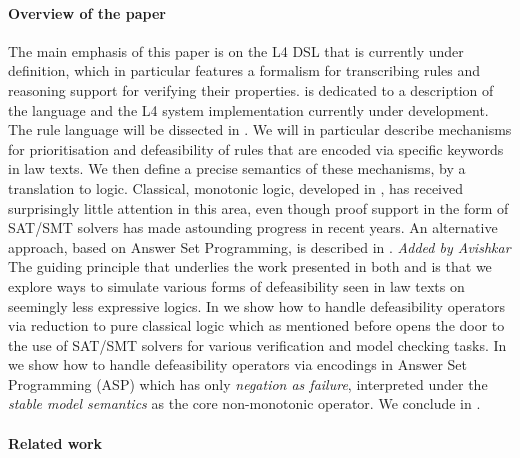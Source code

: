
\paragraph{Overview of the paper}
The main emphasis of this paper is on the L4 DSL that is currently under
definition, which in particular features a formalism for transcribing rules
and reasoning support for verifying their properties.  is dedicated to a description of the language
and the L4 system implementation currently under development. The rule
language will be dissected in . We will in
particular describe mechanisms for prioritisation and defeasibility of rules
that are encoded via specific keywords in law texts. We then define a precise
semantics of these mechanisms, by a translation to logic. Classical, monotonic
logic, developed in , has received surprisingly
little attention in this area, even though proof support in the form of
SAT/SMT solvers has made astounding progress in recent years. An alternative
approach, based on Answer Set Programming, is described in
. \emph{Added by Avishkar} The guiding principle that underlies the work presented in both  and  is that we explore ways to simulate various forms of defeasibility seen in law texts on seemingly less expressive logics. In  we show how to handle defeasibility operators via reduction to pure classical logic which as mentioned before opens the door to the use of SAT/SMT solvers for various verification and model checking tasks. In  we show how to handle defeasibility operators via encodings in Answer Set Programming (ASP) which has only \emph{negation as failure}, interpreted under the \emph{stable model semantics} as the core non-monotonic operator. We conclude in . 


\paragraph{Related work}

